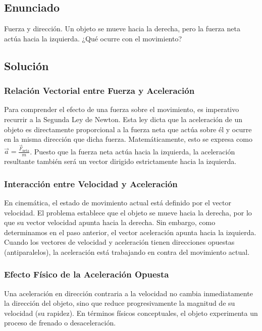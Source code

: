 \documentclass[12pt]{article}
\begin{document}
\newpage

\subsection*{Enunciado}
Fuerza y dirección. Un objeto se mueve hacia la derecha, pero la fuerza neta actúa hacia la izquierda. ¿Qué ocurre con el movimiento?

\subsection*{Solución}

\subsubsection*{Relación Vectorial entre Fuerza y Aceleración}
Para comprender el efecto de una fuerza sobre el movimiento, es imperativo recurrir a la Segunda Ley de Newton. Esta ley dicta que la aceleración de un objeto es directamente proporcional a la fuerza neta que actúa sobre él y ocurre en la misma dirección que dicha fuerza. Matemáticamente, esto se expresa como $\vec{a} = \frac{\vec{F}_{\text{neta}}}{m}$. Puesto que la fuerza neta actúa hacia la izquierda, la aceleración resultante también será un vector dirigido estrictamente hacia la izquierda.

\subsubsection*{Interacción entre Velocidad y Aceleración}
En cinemática, el estado de movimiento actual está definido por el vector velocidad. El problema establece que el objeto se mueve hacia la derecha, por lo que su vector velocidad apunta hacia la derecha. Sin embargo, como determinamos en el paso anterior, el vector aceleración apunta hacia la izquierda. Cuando los vectores de velocidad y aceleración tienen direcciones opuestas (antiparalelos), la aceleración está trabajando en contra del movimiento actual. 

\subsubsection*{Efecto Físico de la Aceleración Opuesta}
Una aceleración en dirección contraria a la velocidad no cambia inmediatamente la dirección del objeto, sino que reduce progresivamente la magnitud de su velocidad (su rapidez). En términos físicos conceptuales, el objeto experimenta un proceso de frenado o desaceleración.
\end{document}
